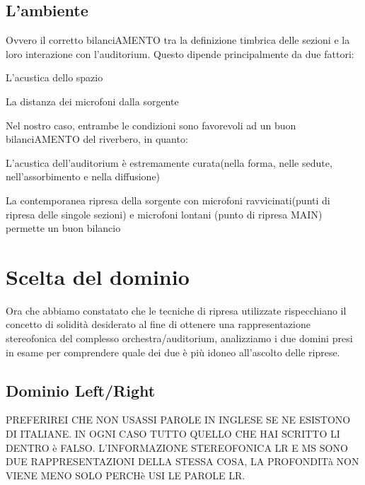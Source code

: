 \subsection{L'ambiente}
Ovvero il corretto bilanciAMENTO tra la definizione timbrica delle sezioni e la loro interazione con l'auditorium. Questo dipende principalmente da due fattori:
\begin{compactitem}
	\item L'acustica dello spazio
	\item La distanza dei microfoni dalla sorgente
\end{compactitem}
Nel nostro caso, entrambe le condizioni sono favorevoli ad un buon bilanciAMENTO del riverbero, in quanto:
\begin{compactitem}
	\item L'acustica dell'auditorium è estremamente curata(nella forma, nelle sedute, nell'assorbimento e nella diffusione)
	\item La contemporanea ripresa della sorgente con microfoni ravvicinati(punti di ripresa delle singole sezioni) e microfoni lontani (punto di ripresa MAIN) permette un buon bilancio
\end{compactitem}

\section*{Scelta del dominio}
Ora che abbiamo constatato che le tecniche di ripresa utilizzate rispecchiano il concetto di solidità desiderato al fine di ottenere una rappresentazione stereofonica del complesso orchestra/auditorium, analizziamo i due domini presi in esame per comprendere quale dei due è più idoneo all'ascolto delle riprese.

\subsection{Dominio Left/Right}

PREFERIREI CHE NON USASSI PAROLE IN INGLESE SE NE ESISTONO DI ITALIANE. 
IN OGNI CASO TUTTO QUELLO CHE HAI SCRITTO LI DENTRO è FALSO. 
L'INFORMAZIONE STEREOFONICA LR E MS SONO DUE RAPPRESENTAZIONI DELLA STESSA COSA, LA PROFONDITà NON VIENE MENO SOLO PERCHè USI LE PAROLE LR.



